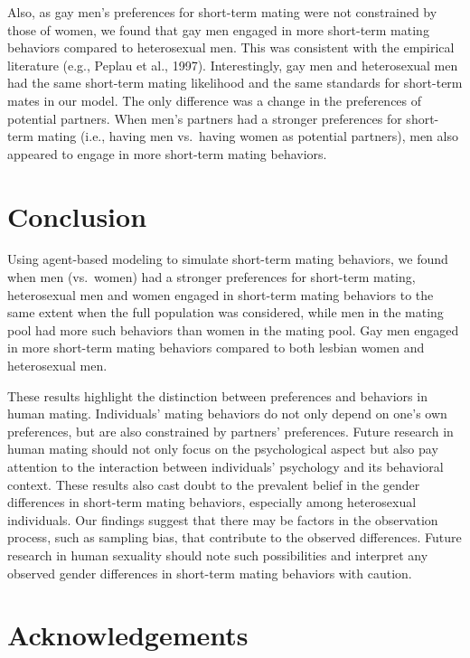 \documentclass[
  11pt,
]{article}
\begin{document}
Also, as gay men's preferences for short-term mating were not
constrained by those of women, we found that gay men engaged in more
short-term mating behaviors compared to heterosexual men. This was
consistent with the empirical literature (e.g., Peplau et al., 1997).
Interestingly, gay men and heterosexual men had the same short-term
mating likelihood and the same standards for short-term mates in our
model. The only difference was a change in the preferences of potential
partners. When men's partners had a stronger preferences for short-term
mating (i.e., having men vs.~having women as potential partners), men
also appeared to engage in more short-term mating behaviors.

\hypertarget{conclusion}{%
\section{Conclusion}\label{conclusion}}

Using agent-based modeling to simulate short-term mating behaviors, we
found when men (vs.~women) had a stronger preferences for short-term
mating, heterosexual men and women engaged in short-term mating
behaviors to the same extent when the full population was considered,
while men in the mating pool had more such behaviors than women in the
mating pool. Gay men engaged in more short-term mating behaviors
compared to both lesbian women and heterosexual men.

These results highlight the distinction between preferences and
behaviors in human mating. Individuals' mating behaviors do not only
depend on one's own preferences, but are also constrained by partners'
preferences. Future research in human mating should not only focus on
the psychological aspect but also pay attention to the interaction
between individuals' psychology and its behavioral context. These
results also cast doubt to the prevalent belief in the gender
differences in short-term mating behaviors, especially among
heterosexual individuals. Our findings suggest that there may be factors
in the observation process, such as sampling bias, that contribute to
the observed differences. Future research in human sexuality should note
such possibilities and interpret any observed gender differences in
short-term mating behaviors with caution.

\hypertarget{acknowledgements}{%
\section{Acknowledgements}\label{acknowledgements}}
\end{document}
